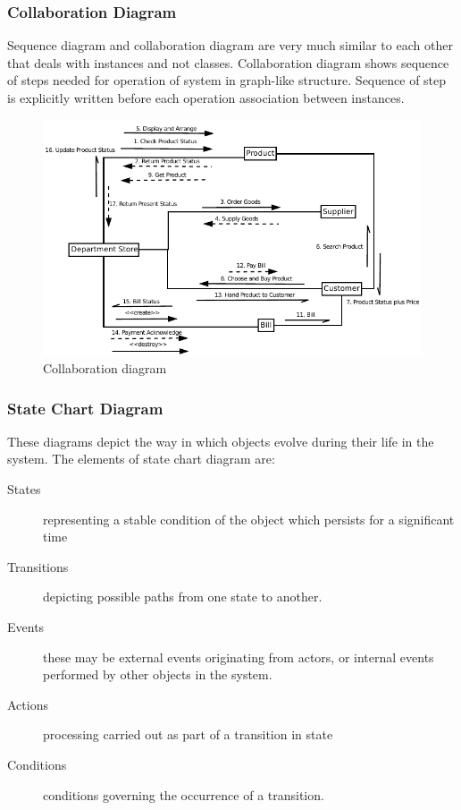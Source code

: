 \subsubsection{Collaboration Diagram}

Sequence diagram and collaboration diagram are very much similar to each other
that deals with instances and not classes. Collaboration diagram shows sequence
of steps needed for operation of system in graph-like structure. Sequence of
step is explicitly written before each operation association between instances.

\begin{figure}[h!]\centering
  \includegraphics[width=\textwidth]{fig/collaboration}
  \caption{Collaboration diagram}\label{fig:collaboration}
\end{figure}


\subsubsection{State Chart Diagram}

These diagrams depict the way in which objects evolve during their life in the
system. The elements of state chart diagram are:
\begin{description}
  \item[States] representing a stable condition of the object which persists
    for a significant time
  \item[Transitions] depicting possible paths from one state to another.
  \item[Events] these may be external events originating from actors, or
    internal events performed by other objects in the system.
  \item[Actions] processing carried out as part of a transition in state
  \item[Conditions] conditions governing the occurrence of a transition.
\end{description}

